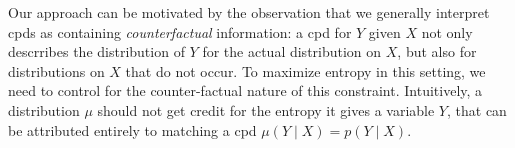 \documentclass{article}
\theoremstyle{plain}
\theoremstyle{definition}
\theoremstyle{remark}
\newcommand{\commentout}[1]{\ignorespaces}
\numberwithin{equation}{section}
\begin{document}
% 
        
        Our approach can be motivated by the observation that we generally interpret cpds as containing
\emph{counterfactual} information:  
	a cpd for $Y$ given $X$ not only descrribes the distribution of $Y$
		for the actual distribution on $X$, but also for
		distributions on $X$ that do not occur.
		To maximize entropy in this setting, we need to control for the counter-factual nature of this constraint.
		Intuitively, a distribution $\mu$ should not get credit for the entropy it gives a variable $Y$, that can be attributed entirely to matching a cpd $\mu(Y\mid X) = p(Y \mid X)$.
	
\end{document}
